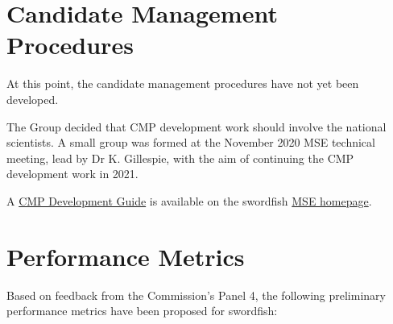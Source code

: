 \documentclass[
]{article}
\begin{document}
\hypertarget{candidate-management-procedures}{%
\section{Candidate Management Procedures}\label{candidate-management-procedures}}

At this point, the candidate management procedures have not yet been developed.

The Group decided that CMP development work should involve the national scientists. A small group was formed at the November 2020 MSE technical meeting, lead by Dr K. Gillespie, with the aim of continuing the CMP development work in 2021.

A \href{../cMPdevelopment/CMP-Development-Guide.html}{CMP Development Guide} is available on the swordfish \href{https://iccat.github.io/}{MSE homepage}.

\hypertarget{performance-metrics}{%
\section{Performance Metrics}\label{performance-metrics}}

Based on feedback from the Commission's Panel 4, the following preliminary performance metrics have been proposed for swordfish:
\end{document}
